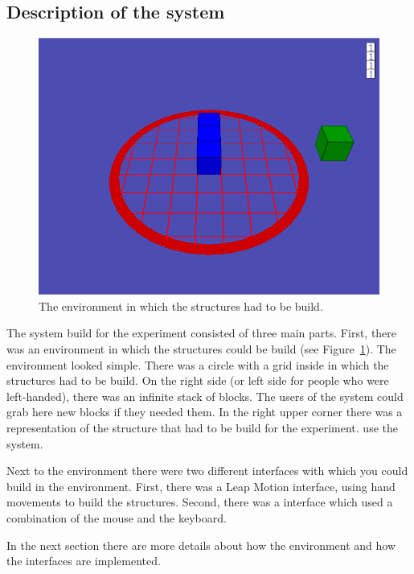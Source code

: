 \subsection{Description of the system}
\begin{figure}[H]
\includegraphics[width=\textwidth]{imgs/environment}
\caption{The environment in which the structures had to be build.}
\label{fig:environment}
\end{figure}

The system build for the experiment consisted of three main parts. First, there was an environment in which the structures could be build (see Figure~\ref{fig:environment}). 
The environment looked simple. There was a circle with a grid inside in which the structures had to be build. On the right side (or left side for people who were left-handed), 
there was an infinite stack of blocks. The users of the system could grab here new blocks if they needed them. In the right upper corner there was a representation of the structure 
that had to be build for the experiment.
use the system. 

Next to the environment there were two different interfaces with which you could build in the environment. First, there was a Leap Motion interface, using hand movements to 
build the structures. Second, there was a interface which used a combination of the mouse and the keyboard.

In the next section there are more details about how the environment and how the interfaces are implemented.

